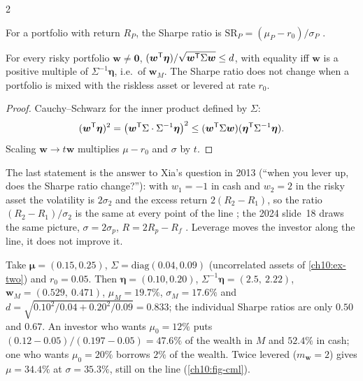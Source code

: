 \begin{paracol}{2}
\begin{definition}
For a portfolio with return $R_P$, the Sharpe ratio is $\mathrm{SR}_P=(\mu_P-r_0)/\sigma_P$
.
\end{definition}

\begin{proposition}\label{ch10:prop-sharpe}
For every risky portfolio $\bm w\neq\bm 0$, $(\bm w^{\mathsf T}\bm\eta)/\sqrt{\bm w^{\mathsf T}\Sigma\bm w}\le d$, with equality iff $\bm w$
is a positive multiple of $\Sigma^{-1}\bm\eta$, i.e.\ of $\bm w_M$. The Sharpe ratio does not change when a portfolio
is mixed with the riskless asset or levered at rate $r_0$.
\end{proposition}
\begin{proof}
Cauchy--Schwarz for the inner product defined by $\Sigma$:
\[(\bm w^{\mathsf T}\bm\eta)^2=\bigl(\bm w^{\mathsf T}\Sigma\cdot\Sigma^{-1}\bm\eta\bigr)^2
\le(\bm w^{\mathsf T}\Sigma\bm w)(\bm\eta^{\mathsf T}\Sigma^{-1}\bm\eta).\] Scaling $\bm w\to t\bm w$ multiplies $\mu-r_0$ and $\sigma$ by $t$.
\end{proof}

The last statement is the answer to Xia's question in 2013 (``when you lever up, does the Sharpe ratio change?''):
with $w_1=-1$ in cash and $w_2=2$ in the risky asset the volatility is $2\sigma_2$ and the excess return
$2(R_2-R_1)$, so the ratio $(R_2-R_1)/\sigma_2$ is the same at every point of the line
; the 2024 slide~18 draws the same picture,
$\sigma=2\sigma_p$, $R=2R_p-R_f$ . Leverage moves the investor along the line, it does not improve it.

\begin{example}\label{ch10:ex-tobin}
Take $\bm\mu=(0.15,0.25)$, $\Sigma=\mathrm{diag}(0.04,0.09)$ (uncorrelated assets of \cref{ch10:ex-two}) and
$r_0=0.05$. Then $\bm\eta=(0.10,0.20)$, $\Sigma^{-1}\bm\eta=(2.5,\ 2.22)$, $\bm w_M=(0.529,\ 0.471)$,
$\mu_M=19.7\%$, $\sigma_M=17.6\%$ and $d=\sqrt{0.10^2/0.04+0.20^2/0.09}=0.833$; the individual Sharpe ratios are only
$0.50$ and $0.67$. An investor who wants $\mu_0=12\%$ puts $(0.12-0.05)/(0.197-0.05)=47.6\%$ of the wealth in $M$ and
$52.4\%$ in cash; one who wants $\mu_0=20\%$ borrows $2\%$ of the wealth. \sloppy Twice levered ($m_{\bm w}=2$) gives
$\mu=34.4\%$ at $\sigma=35.3\%$, still on the line (\cref{ch10:fig-cml}).
\end{example}


\end{paracol}
